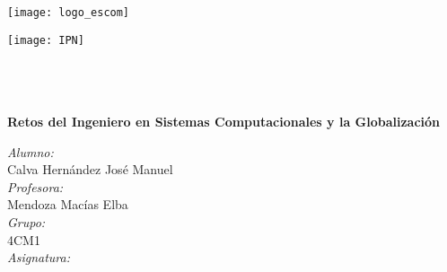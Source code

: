 \pagestyle{empty}
	\begin{center}	
		\begin{minipage}{0.48\textwidth} 
			\begin{flushleft}
				\texttt{[image: logo\_escom]}
		\end{flushleft}\end{minipage}
		\begin{minipage}{0.48\textwidth} \begin{flushright}
				\texttt{[image: IPN]}
		\end{flushright}\end{minipage}\\	
		\vspace{1cm} %
		\textsc{\huge \universidad}\\[0.5cm]
		\textsc{\LARGE \escuela}\\[0.5cm]	
		\vspace{0.4cm}			
		{ \huge \bfseries Retos del Ingeniero en Sistemas Computacionales y la Globalizaci\'on}\\[0.4cm]
		\vspace{0.4cm}	
		\begin{minipage}{0.46\textwidth}								
			\begin{center} \large	
				\emph{Alumno:}\\
    		     Calva Hern\'andez Jos\'e Manuel\\
				\vspace{5mm}
				\emph{Profesora:}\\	
				Mendoza Mac\'ias Elba\\
				\vspace{5mm} 
				\emph{Grupo: }\\	    
				4CM1\\
				\vspace{5mm}
				\emph{Asignatura: }\\	
				\Asignatura{}\\
			\end{center}			
		\end{minipage}		
	\end{center}																	
\newpage